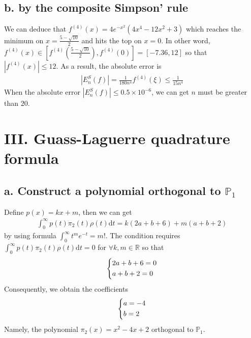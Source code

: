 \documentclass[twoside,a4paper]{article}
\newcommand{\dif}{\mathrm{d}}
\begin{document}
\subsection*{b. by the composite Simpson' rule}
We can deduce that $f^{(4)}(x)=4e^{-x^2}(4x^4-12x^2+3)$ which reaches the minimum on $x=\frac{5-\sqrt{10}}{2}$ and hits the top on $x=0$. In other word, $f^{(4)}(x) \in [f^{(4)}(\frac{5-\sqrt{10}}{2}),f^{(4)}(0)]=[-7.36,12]$ so that $|f^{(4)}(x)|\leq 12$. As a result, the absolute error is 
\begin{gather}
|E^S_n(f)|=\frac{1}{180n^4}f^{(4)}(\xi) \leq \frac{1}{15n^4}
\end{gather}
When the absolute error $|E^S_n(f)| \leq 0.5\times10^{-6}$, we can get $n$ must be greater than $20$.
\section*{III. Guass-Laguerre quadrature formula}

\subsection*{a. Construct a polynomial orthogonal to $\mathbb{P}_1$}
Define $p(x)= kx+m$, then we can get
\begin{gather}
\int_0^{\infty}p(t)\pi_2(t)\rho(t) \dif t=k(2a+b+6)+m(a+b+2)
\end{gather}
by using formula $\int_0^{\infty} t^me^{-t}= m!$. The condition requires $\int_0^{\infty}p(t)\pi_2(t)\rho(t) \dif t=0$ for $\forall k,m \in \mathbb{R}$ so that
\[ \left 
\{ \begin{lgathered}
2a+b+6=0 \\
a+b+2=0
\end{lgathered} \right. 
\]
Consequently, we obtain the coefficients 
\[ \left 
\{ \begin{lgathered}
a=-4\\
b=2
\end{lgathered} \right. 
\]
Namely, the polynomial $\pi_2(x)=x^2-4x+2$ orthogonal to $\mathbb{P}_1$.
\end{document}
